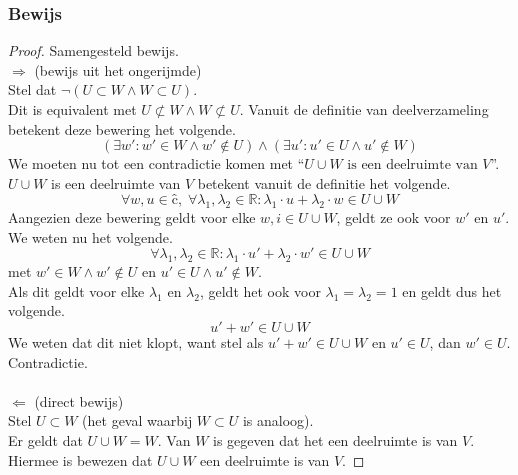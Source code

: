 \documentclass[lineaire_algebra_oplossingen.tex]{subfiles}
\begin{document}
\subsubsection*{Bewijs}
\begin{proof} Samengesteld bewijs.\\
$\Longrightarrow$ (bewijs uit het ongerijmde)\\ %
Stel dat $\neg(U \subset W \wedge W \subset U)$.\\
Dit is equivalent met $U \not\subset W \wedge W \not\subset U$.
Vanuit de definitie van deelverzameling betekent deze bewering het volgende.
\[
(\exists w': w' \in W \wedge w' \not\in U) \wedge (\exists u': u' \in U \wedge u' \not\in W) 
\]
We moeten nu tot een contradictie komen met ``$U\cup W \text{ is een deelruimte van }V$''.
$U\cup W$ is een deelruimte van $V$ betekent vanuit de definitie het volgende.
\[
\forall w, u \in ĉ,\; \forall \lambda_1 , \lambda_2 \in \mathbb{R}: \lambda_1\cdot u + \lambda_2\cdot w \in U\cup W
\]
Aangezien deze bewering geldt voor elke $w,i \in U\cup W$, geldt ze ook voor $w'$ en $u'$.
We weten nu het volgende.
\[
\forall \lambda_1 , \lambda_2 \in \mathbb{R}: \lambda_1\cdot u' + \lambda_2\cdot w' \in U\cup W
\]
met $w' \in W \wedge w' \not\in U$ en $u' \in U \wedge u' \not\in W$.\\
Als dit geldt voor elke $\lambda_1$ en $\lambda_2$, geldt het ook voor $\lambda_1= \lambda_2 = 1$ en geldt dus het volgende.
\[
u' + w' \in U \cup W
\]
We weten dat dit niet klopt, want stel als $u' + w' \in U \cup W$ en $u' \in U$, dan $w' \in U$. Contradictie.\\\\
$\Longleftarrow$ (direct bewijs)\\
Stel $U \subset W$ (het geval waarbij $W \subset U$ is analoog).\\
Er geldt dat $U\cup W = W$. Van $W$ is gegeven dat het een deelruimte is van $V$. Hiermee is bewezen dat $U\cup W$ een deelruimte is van $V$.
\end{proof}
\end{document}
